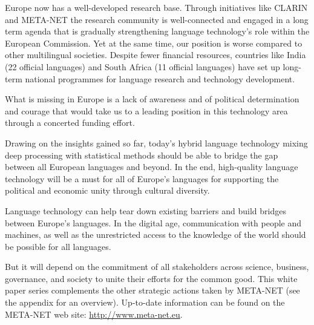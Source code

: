 \documentclass[10pt, plain]{../../metanetpaper}
\begin{document}
\begin{multicols}{2}
Europe now has a well-developed research base. Through initiatives like CLARIN and META-NET the research community is well-connected and engaged in a long term agenda that is gradually strengthening language technology's role within the European Commission. Yet at the same time, our position is worse compared to other multilingual societies. Despite fewer financial resources, countries like India (22 official languages) and South Africa (11 official languages) have set up long-term national programmes for language research and technology development.

What is missing in Europe is a lack of awareness and of political determination and courage that would take us to a leading position in this technology area through a concerted funding effort.

Drawing on the insights gained so far, today’s hybrid language technology mixing deep processing with statistical methods should be able to bridge the gap between all European languages and beyond. In the end, high-quality language technology will be a must for all of Europe's languages for supporting the political and economic unity through cultural diversity.

Language technology can help tear down existing barriers and build bridges between Europe’s languages. In the digital age, communication with people and machines, as well as the unrestricted access to the knowledge of the world should be possible for all languages.

But it will depend on the commitment of all stakeholders across science, business, governance, and society to unite their efforts for the common good.  This white paper series complements the other strategic actions taken by META-NET (see the appendix for an overview). Up-to-date information can be found on the META-NET web site: \url{http://www.meta-net.eu}.
\end{multicols}

\clearpage

\end{document}
